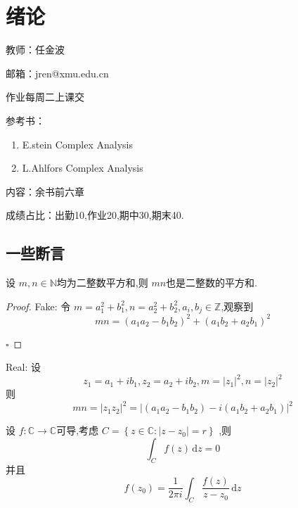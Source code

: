 \documentclass[../../复变函数.tex]{subfiles}
\begin{document}
\chapter{绪论}
    

教师：任金波

邮箱：jren@xmu.edu.cn

作业每周二上课交


\noindent 参考书：
\begin{enumerate}
    \item E.stein Complex Analysis
    \item L.Ahlfors Complex Analysis
\end{enumerate}


\noindent 内容：余书前六章

成绩占比：出勤10,作业20,期中30,期末40.

\section{一些断言}


\begin{example}
    设 \(  m,n \in \mathbb{N}   \)均为二整数平方和,则 \(  mn  \)也是二整数的平方和.
    
    
  \begin{proof}

    \noindent   Fake: 
        令 \(  m = a_1^{2}+ b_1^{2},n =  a_2^{2}+ b_2^{2}, a_{i},b_{j} \in \mathbb{Z}   \),观察到 \[
        mn =  \left( a_1a_2-b_1b_2 \right)^{2}+  \left( a_1b_2+ a_2b_1 \right)^{2}  
        \] 
    
        \hfill $\square$
    \end{proof}
     
    \noindent Real: 设 \[
    z_1=  a_1+  ib_1,z_2= a_2+ ib_2  , m=  \left| z_1 \right|^{2},n =   \left| z_2 \right|^{2}
    \]则 \[
    mn =  \left| z_1z_2 \right|^{2} =  \left| \left( a_1a_2-b_1b_2 \right) - i\left( a_1b_2+ a_2b_1 \right)   \right|^{2}  
    \]
\end{example}


\hspace*{\fill} 


\begin{example}
    设 \(  f:\mathbb{C} \to \mathbb{C}   \)可导,考虑 \(  C =  \left\{ z \in \mathbb{C} :\left| z-z_0 \right|= r  \right\}  \) ,则 \[
    \int_{C}f\left( z \right)\,\mathrm{d} z= 0 
    \] 并且 \[
    f\left( z_0 \right)=  \frac{1}{2\pi i}  \int_{C} \frac{f\left( z \right)  }{z-z_0 } \,\mathrm{d} z  
    \]
\end{example}
\end{document}

